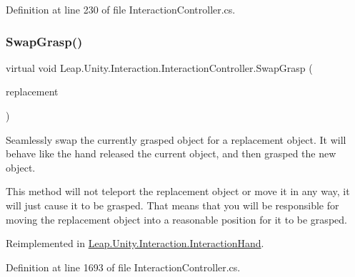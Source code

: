 Definition at line 230 of file Interaction\+Controller.\+cs.

\mbox{\label{class_leap_1_1_unity_1_1_interaction_1_1_interaction_controller_a329e2f56f76c46d70a93b4508e867196}} 
\subsubsection{\texorpdfstring{SwapGrasp()}{SwapGrasp()}}
{\footnotesize\ttfamily virtual void Leap.\+Unity.\+Interaction.\+Interaction\+Controller.\+Swap\+Grasp (\begin{DoxyParamCaption}\item[{\mbox{\hyperlink{interface_leap_1_1_unity_1_1_interaction_1_1_i_interaction_behaviour}{I\+Interaction\+Behaviour}}}]{replacement }\end{DoxyParamCaption})\hspace{0.3cm}{\ttfamily [virtual]}}



Seamlessly swap the currently grasped object for a replacement object. It will behave like the hand released the current object, and then grasped the new object. 

This method will not teleport the replacement object or move it in any way, it will just cause it to be grasped. That means that you will be responsible for moving the replacement object into a reasonable position for it to be grasped. 

Reimplemented in \mbox{\hyperlink{class_leap_1_1_unity_1_1_interaction_1_1_interaction_hand_a0a175ec3d49aae78a5c6951fd744080b}{Leap.\+Unity.\+Interaction.\+Interaction\+Hand}}.



Definition at line 1693 of file Interaction\+Controller.\+cs.

\mbox{\label{class_leap_1_1_unity_1_1_interaction_1_1_interaction_controller_a8a3b2a0cac8dd47e4a447c5d188b8ca8}} 

